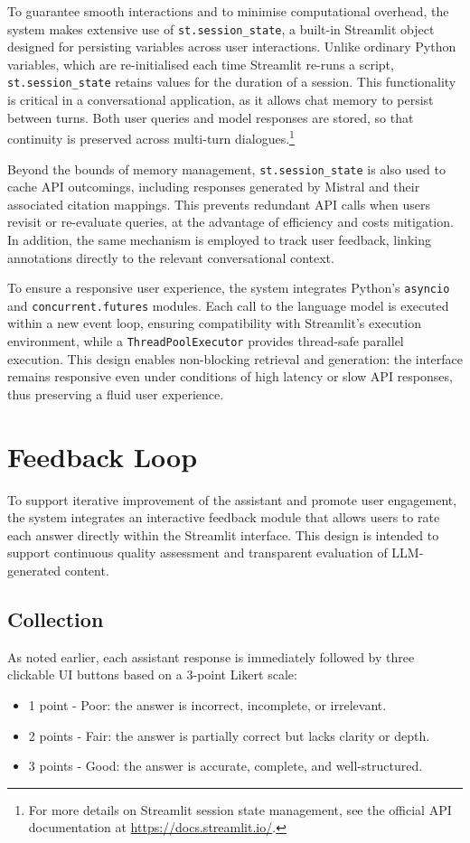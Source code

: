 \begin{spacing}{1.5}
To guarantee smooth interactions and to minimise computational overhead, the system makes extensive use of \texttt{st.session\_state}, a built-in Streamlit object designed for persisting variables across user interactions. Unlike ordinary Python variables, which are re-initialised each time Streamlit re-runs a script, \texttt{st.session\_state} retains values for the duration of a session. This functionality is critical in a conversational application, as it allows chat memory to persist between turns. Both user queries and model responses are stored, so that continuity is preserved across multi-turn dialogues.\footnote{For more details on Streamlit session state management, see the official API documentation at \url{https://docs.streamlit.io/}.\nocite{noauthor_streamlit_2025}} 

Beyond the bounds of memory management, \texttt{st.session\_state} is also used to cache API outcomings, including responses generated by Mistral and their associated citation mappings. This prevents redundant API calls when users revisit or re-evaluate queries, at the advantage of efficiency and costs mitigation. In addition, the same mechanism is employed to track user feedback, linking annotations directly to the relevant conversational context.

To ensure a responsive user experience, the system integrates Python's \texttt{asyncio} and \texttt{concurrent.futures} modules. Each call to the language model is executed within a new event loop, ensuring compatibility with Streamlit’s execution environment, while a \texttt{ThreadPoolExecutor} provides thread-safe parallel execution. This design enables non-blocking retrieval and generation: the interface remains responsive even under conditions of high latency or slow API responses, thus preserving a fluid user experience.


\section{Feedback Loop}
To support iterative improvement of the assistant and promote user engagement, the system integrates an interactive feedback module that allows users to rate each answer directly within the Streamlit interface. This design is intended to support continuous quality assessment and transparent evaluation of LLM-generated content.

\subsection{Collection}
As noted earlier, each assistant response is immediately followed by three clickable UI buttons based on a 3-point Likert scale:
\begin{itemize}
\item 1 point - Poor: the answer is incorrect, incomplete, or irrelevant.
\item 2 points - Fair: the answer is partially correct but lacks clarity or depth.
\item 3 points - Good: the answer is accurate, complete, and well-structured.
\end{itemize}


\end{spacing}
